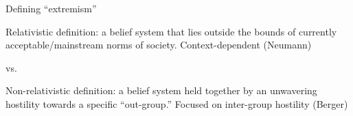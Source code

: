 \documentclass[nobackground,dvipsnames,table]{beamer}
\begin{document}
\begin{frame}{Defining “extremism”}
\begin{center}
    Relativistic definition: a belief system that lies outside the bounds of currently acceptable/mainstream norms of society. Context-dependent (Neumann)
\end{center}

\begin{center}
    vs.
\end{center}

\begin{center}
    Non-relativistic definition: a belief system held together by an unwavering hostility towards a specific “out-group.” Focused on inter-group hostility (Berger)
\end{center}

\end{frame}
\end{document}
